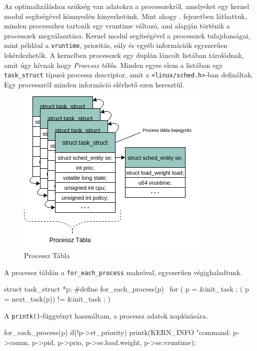 

Az optimalizáláshoz szükség van adatokra a processzekről, amelyeket egy kernel modul segítségével könnyedén kinyerhetünk.
Mint ahogy . fejezetben láthattuk, minden processzhez tartozik egy vruntime változó, ami alapján történik a processzek megválasztása. 
Kernel modul segítségével a processzek tulajdonságai, mint például a \texttt{vruntime}, prioritás, súly és egyéb információk egyszerűen lekérdezhetők.
A kernelben processzek egy duplán láncolt listában tárolódnak, amit úgy hívnak hogy \textit{Processz tábla}. Minden egyes elem a listában egy \texttt{task\_struct} típusú processz descriptor, amit a \texttt{<linux/sched.h>}-ban defináltak. Egy processzről minden információ elérhető ezen keresztül.

\begin{figure}[h!]
\centering
\includegraphics[scale=0.75]{images/processTable.png}
\caption{Processz Tábla}
\label{fig:structurehierarchi}
\end{figure}

\noindent A processz táblán a \texttt{for\_each\_process} makróval, egyszerűen végighaladtunk.
\begin{cpp}
struct task_struct *p;
#define for_each_process(p) \
	 for ( p = &init_task ; ( p = next_task(p)) != &init_task ; )
\end{cpp}
A \texttt{printk()}-függvényt használtam, a processz adatok naplózására.
\begin{cpp}
for_each_process(p)
    if(!p->rt_priority)
        printk(KERN_INFO
        "command: %
        p->comm, p->pid, p->prio, p->se.load.weight, p->se.vruntime);

\end{cpp}

